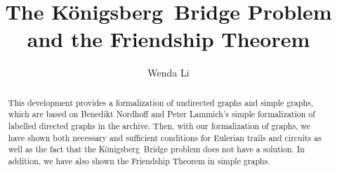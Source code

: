 \documentclass[11pt,a4paper]{article}
\newcommand{\koni}{\textrm{K\"{o}nigsberg}\ }
\begin{document}
\title{The \koni Bridge Problem and the Friendship Theorem}
\author{Wenda Li}
\maketitle

\begin{abstract}
  This development provides a formalization of undirected graphs and simple graphs, which are based on Benedikt Nordhoff and  Peter Lammich's simple formalization of labelled directed graphs \cite{website:isabelle_archive_shortest_path} in the archive. Then, with our formalization of graphs, we have shown both necessary and sufficient conditions for Eulerian trails and circuits \cite{koni_proof_lecture_notes} as well as the fact that the \koni Bridge problem does not have a solution. In addition, we have also shown the Friendship Theorem in simple graphs\cite{friend_combitorial,mertzios2008friendship}.  
\end{abstract}

\tableofcontents





\end{document}
